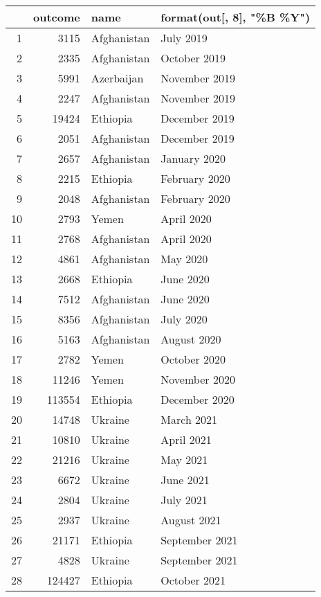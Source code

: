 \begin{table}[ht]
\centering
\begin{tabular}{rrll}
  \hline
 & outcome & name & format(out[, 8], "\%B \%Y") \\ 
  \hline
1 & 3115 & Afghanistan & July 2019 \\ 
  2 & 2335 & Afghanistan & October 2019 \\ 
  3 & 5991 & Azerbaijan & November 2019 \\ 
  4 & 2247 & Afghanistan & November 2019 \\ 
  5 & 19424 & Ethiopia & December 2019 \\ 
  6 & 2051 & Afghanistan & December 2019 \\ 
  7 & 2657 & Afghanistan & January 2020 \\ 
  8 & 2215 & Ethiopia & February 2020 \\ 
  9 & 2048 & Afghanistan & February 2020 \\ 
  10 & 2793 & Yemen & April 2020 \\ 
  11 & 2768 & Afghanistan & April 2020 \\ 
  12 & 4861 & Afghanistan & May 2020 \\ 
  13 & 2668 & Ethiopia & June 2020 \\ 
  14 & 7512 & Afghanistan & June 2020 \\ 
  15 & 8356 & Afghanistan & July 2020 \\ 
  16 & 5163 & Afghanistan & August 2020 \\ 
  17 & 2782 & Yemen & October 2020 \\ 
  18 & 11246 & Yemen & November 2020 \\ 
  19 & 113554 & Ethiopia & December 2020 \\ 
  20 & 14748 & Ukraine & March 2021 \\ 
  21 & 10810 & Ukraine & April 2021 \\ 
  22 & 21216 & Ukraine & May 2021 \\ 
  23 & 6672 & Ukraine & June 2021 \\ 
  24 & 2804 & Ukraine & July 2021 \\ 
  25 & 2937 & Ukraine & August 2021 \\ 
  26 & 21171 & Ethiopia & September 2021 \\ 
  27 & 4828 & Ukraine & September 2021 \\ 
  28 & 124427 & Ethiopia & October 2021 \\ 

\end{tabular}
\end{table}
